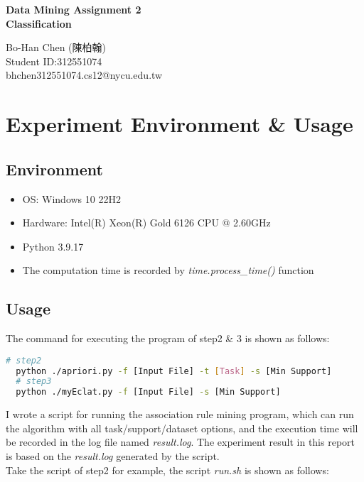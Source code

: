 \documentclass[a4paper, oneside, final, 12pt]{scrartcl} %
\begin{document}


\begin{center}
    {\fontsize{18}{30}\textbf{Data Mining Assignment 2 \\ Classification}}
\end{center}

\begin{center}
  Bo-Han Chen (陳柏翰) \\
  Student ID:312551074 \\
  bhchen312551074.cs12@nycu.edu.tw
\end{center}

\section{Experiment Environment \& Usage}

\begingroup
\raggedright

\subsection{Environment}

\begin{itemize}
  \item OS: Windows 10 22H2
  \item Hardware: Intel(R) Xeon(R) Gold 6126 CPU @ 2.60GHz
  \item Python 3.9.17
  \item The computation time is recorded by \emph{time.process\_time()} function
\end{itemize}

\subsection{Usage}

The command for executing the program of step2 \& 3 is shown as follows:

\begin{lstlisting}[language=bash]
  # step2
  python ./apriori.py -f [Input File] -t [Task] -s [Min Support]
  # step3
  python ./myEclat.py -f [Input File] -s [Min Support]
\end{lstlisting}

I wrote a script for running the association rule mining program,
which can run the algorithm with all task/support/dataset options,
and the execution time will be recorded in the log file named \emph{result.log}.
The experiment result in this report is 
based on the \emph{result.log} generated by the script. \\
Take the script of step2 for example, the script 
\emph{run.sh} is shown as follows:
\end{document}
